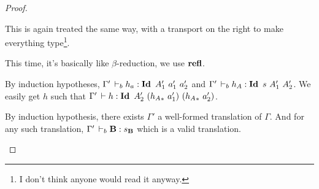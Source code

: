\documentclass[a4paper,english]{lipics-utf8x}
\begin{document}
\begin{proof}
\begin{caselist}
      \begin{graycase}
        \begin{mathc}
        \end{mathc}
        This is again treated the same way, with a transport on the right to
        make everything
        type\footnote{I don't think anyone would read it anyway.}.
      \end{graycase}

      \begin{graycase}
        \begin{mathc}
        \end{mathc}
        This time, it's basically like $\beta$-reduction, we use $\operatorname{\mathbf{refl}}$.
      \end{graycase}

      \begin{graycase}
        \begin{mathc}
        \end{mathc}
        By induction hypotheses, $\Gamma' \,\vdash_b h_a : \operatorname{\mathbf{Id}~} A'_1\ a'_1\ a'_2$
        and $\Gamma' \,\vdash_b h_A : \operatorname{\mathbf{Id}~} s\ A'_1\ A'_2$.
        We easily get $h$ such that $\Gamma' \der h : \Id A'_2\ %
        ({h_A}_*\ a'_1)\ ({h_A}_*\ a'_2)$.
      \end{graycase}

      \nextcase
      \begin{mathc}
        \ru{\derr \Gamma
          }{\Gamma \derr \mR : \sB}
      \end{mathc}
      By induction hypothesis, there exists $\Gamma'$ a well-formed translation
      of $\Gamma$. And for any such translation, $\Gamma' \,\vdash_b \operatorname{\mathbf{B}} : s_{\operatorname{\mathbf{B}}}$
      which is a valid translation.


\end{caselist}
\end{proof}
\end{document}
